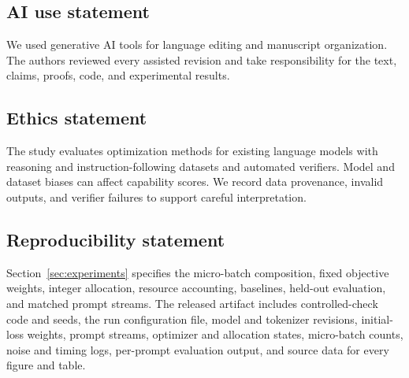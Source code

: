 \subsection*{AI use statement}

We used generative AI tools for language editing and manuscript organization.
The authors reviewed every assisted revision and take responsibility for the
text, claims, proofs, code, and experimental results.

\subsection*{Ethics statement}

The study evaluates optimization methods for existing language models with
reasoning and instruction-following datasets and automated verifiers. Model and
dataset biases can affect capability scores. We record data provenance, invalid
outputs, and verifier failures to support careful interpretation.

\subsection*{Reproducibility statement}

Section~\ref{sec:experiments} specifies the micro-batch composition, fixed
objective weights, integer allocation, resource accounting, baselines,
held-out evaluation, and matched prompt streams. The released
artifact includes controlled-check code and seeds, the run configuration file,
model and tokenizer
revisions, initial-loss weights, prompt streams, optimizer and allocation
states, micro-batch counts, noise and timing logs, per-prompt evaluation output,
and source data for every figure and table.
